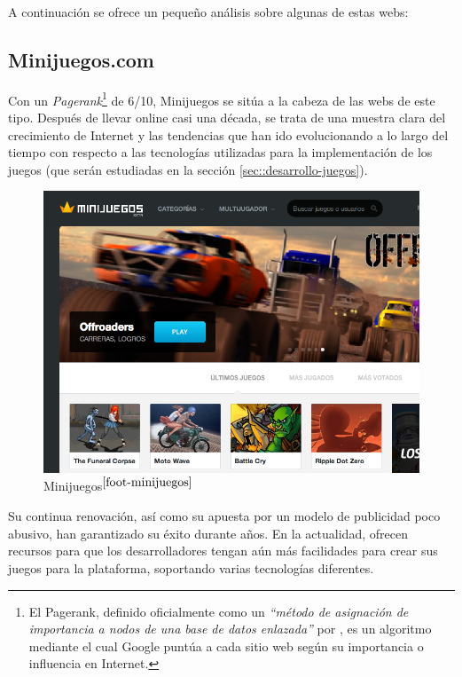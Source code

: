 A continuación se ofrece un pequeño análisis sobre algunas de estas webs:

\subsection*{Minijuegos.com}

Con un {\it Pagerank}\footnote{El Pagerank, definido oficialmente como un {\it ``método de asignación de importancia a nodos de una base de datos enlazada''} por \cite{Lawrence2007}, es un algoritmo mediante el cual Google puntúa a cada sitio web según su importancia o influencia en Internet.} de 6/10, Minijuegos \cite{Minijuegos} se sitúa a la cabeza de las webs de este tipo. Después de llevar online casi una década, se trata de una muestra clara del crecimiento de Internet y las tendencias que han ido evolucionando a lo largo del tiempo con respecto a las tecnologías utilizadas para la implementación de los juegos (que serán estudiadas en la sección \ref{sec::desarrollo-juegos}).

\begin{figure}[h]
  \begin{center}
    \includegraphics[width=\textwidth]{images/minijuegos.png}
    \caption[Minijuegos]{Minijuegos$^{\ref{foot-minijuegos}}$}
  \end{center}
\end{figure}
\addtocounter{footnote}{1}\footnotetext{\label{foot-minijuegos}{\tt http://www.minijuegos.com}}

Su continua renovación, así como su apuesta por un modelo de publicidad poco abusivo, han garantizado su éxito durante años. En la actualidad, ofrecen recursos para que los desarrolladores tengan aún más facilidades para crear sus juegos para la plataforma, soportando varias tecnologías diferentes.

